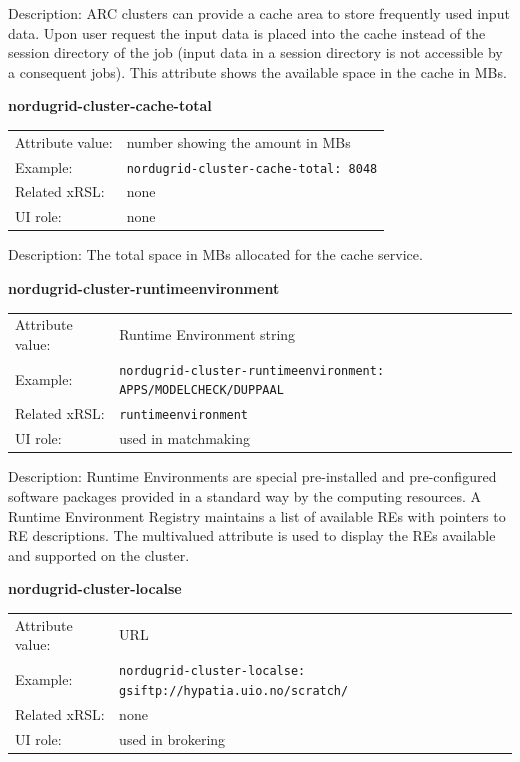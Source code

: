 \documentclass{article}
\begin{document}
Description: ARC clusters can provide a cache area to store frequently used input
data. Upon user request the input data is placed into the cache
instead of the session directory of the job (input data in a session directory
is not accessible by a consequent jobs). This attribute shows the available 
space in the cache in MBs.


  \hspace*{0.5cm}
  \begin{shaded}
    \textbf{nordugrid-cluster-cache-total}
  \end{shaded}
  \begin{tabular}{lp{10cm}}  
    Attribute value:&  number showing the amount in MBs\\
    Example:& \verb#nordugrid-cluster-cache-total: 8048#\\
    Related xRSL:& none\\
    UI role:& none\\    
  \end{tabular}

Description: The total space in MBs allocated for the cache service.


  \hspace*{0.5cm}
  \begin{shaded}
    \textbf{nordugrid-cluster-runtimeenvironment}
  \end{shaded}
  \begin{tabular}{lp{10cm}}  
    Attribute value:& Runtime Environment string\cite{rer}\\
    Example:& \verb#nordugrid-cluster-runtimeenvironment: APPS/MODELCHECK/DUPPAAL#\\
    Related xRSL:& \verb#runtimeenvironment#\\
    UI role:& used in matchmaking\\
  \end{tabular}

Description: Runtime Environments are special pre-installed and pre-configured 
software packages provided in a standard way by the computing resources. 
A Runtime Environment Registry \cite{rer} maintains a list of available REs with
pointers to RE descriptions. The multivalued attribute is used to display the REs available 
and supported on the cluster.


  \hspace*{0.5cm}
  \begin{shaded}
    \textbf{nordugrid-cluster-localse}
  \end{shaded}
  \begin{tabular}{lp{10cm}}  
    Attribute value:& URL\\
    Example:& \verb#nordugrid-cluster-localse: gsiftp://hypatia.uio.no/scratch/#\\
    Related xRSL:& none\\
    UI role:& used in brokering\\ 
  \end{tabular}
\end{document}
